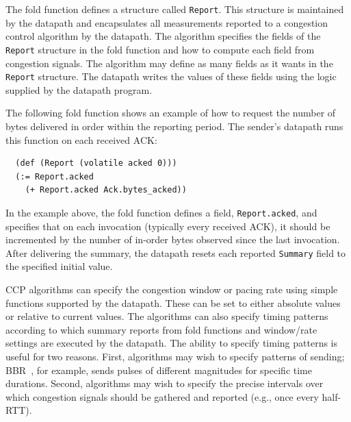The fold function defines a structure called \texttt{Report}. This structure is maintained by the datapath and encapsulates all measurements reported to a congestion control algorithm by the datapath. The algorithm specifies the fields of the \texttt{Report} structure in the fold function and how to compute each field from congestion signals. The algorithm may define as many fields as it wants in the \texttt{Report} structure. The datapath writes the values of these fields using the logic supplied by the datapath program.
 
The following fold function shows an example of how to request the number of bytes delivered in order within the reporting period. The sender's datapath runs this function on each received ACK:

{\footnotesize
\begin{verbatim}
  (def (Report (volatile acked 0)))
  (:= Report.acked
    (+ Report.acked Ack.bytes_acked))
\end{verbatim}
 }
 
In the example above, the fold function defines a field, \texttt{Report.acked}, and specifies that on each invocation (typically every received ACK), it should be incremented by the number of in-order bytes observed since the last invocation. After delivering the summary, the datapath resets each reported \texttt{Summary} field to the specified initial value.

 
 CCP algorithms can specify the congestion window or pacing rate using simple functions supported by the datapath. These can be set to either absolute values or relative to current values. The algorithms can also specify timing patterns according to which summary reports from fold functions and window/rate settings are executed by the datapath. 
The ability to specify timing patterns is useful for two reasons. First, algorithms may wish to specify patterns of sending; BBR~\cite{bbr}, for example, sends pulses of different magnitudes for specific time durations. Second, algorithms may wish to specify the precise intervals over which congestion signals should be gathered and reported (e.g., once every half-RTT).
 
